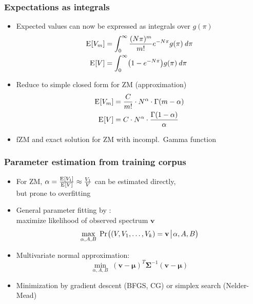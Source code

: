 \documentclass[t]{beamer} %
\begin{document}
\begin{frame}
  \frametitle{Expectations as integrals}

  \begin{itemize}
  \item Expected values can now be expressed as integrals over $g(\pi)$
    \begin{align*}
      \mathrm{E}_{}[V_m] &= \int_0^{\infty} \frac{(N\pi)^m}{m!} e^{-N\pi} g(\pi) \,\mathit{d{\pi}}\\
      \mathrm{E}_{}[V] &= \int_0^{\infty} \bigl( 1 - e^{-N\pi} \bigr) g(\pi) \,\mathit{d{\pi}}
    \end{align*}
  \item<2-> Reduce to simple closed form for ZM (approximation)
    \begin{align*}
      \mathrm{E}_{}[V_m] &= \frac{C}{m!} \cdot N^{\alpha} \cdot \Gamma (m - \alpha) \\
      \mathrm{E}_{}[V] &= C \cdot N^{\alpha} \cdot \frac{\Gamma(1 - \alpha)}{\alpha}
    \end{align*}
  \item<2-> fZM and exact solution for ZM with incompl.\ Gamma function
  \end{itemize}
\end{frame}

\begin{frame}
  \frametitle{Parameter estimation from training corpus}

  \begin{itemize}
  \item For ZM, $\alpha = \frac{\mathrm{E}_{}[V_1]}{\mathrm{E}_{}[V]} \approx \frac{V_1}{V}$ can be estimated directly,\\
    but prone to overfitting
  \item General parameter fitting by :\\
    maximize likelihood of observed spectrum $\mathbf{v}$
    \[
      \max_{\alpha, A, B}\; \mathop{\mathrm{Pr}_{}}\bigl((V, V_1, \ldots, V_k) = \mathbf{v}\!\bigm|\!\alpha, A, B\bigr)
    \]
  \item<2-> Multivariate normal approximation:\\
    \[
      \min_{\alpha, A, B}\; (\mathbf{v} - \pmb{\mu})^T \pmb{\Sigma}^{-1} (\mathbf{v} - \pmb{\mu})
    \]
  \item<2-> Minimization by gradient descent (BFGS, CG) or simplex search (Nelder-Mead)
  \end{itemize}
\end{frame}
\end{document}
